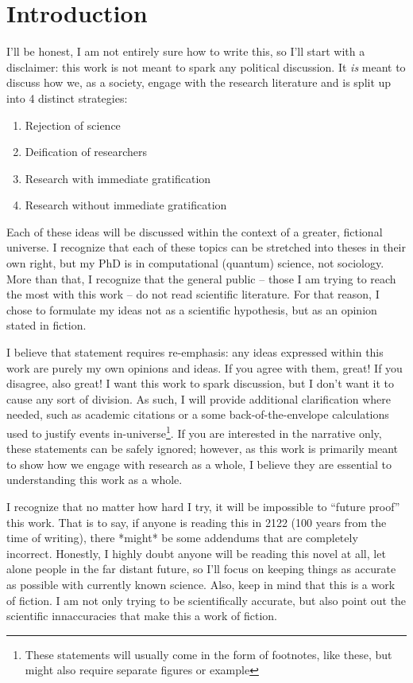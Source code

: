 \chapter*{Introduction}

I'll be honest, I am not entirely sure how to write this, so I'll start with a disclaimer: this work is not meant to spark any political discussion.
It \textit{is} meant to discuss how we, as a society, engage with the research literature and is split up into 4 distinct strategies:

\begin{enumerate}
\item Rejection of science
\item Deification of researchers
\item Research with immediate gratification
\item Research without immediate gratification
\end{enumerate}

Each of these ideas will be discussed within the context of a greater, fictional universe.
I recognize that each of these topics can be stretched into theses in their own right, but my PhD is in computational (quantum) science, not sociology.
More than that, I recognize that the general public -- those I am trying to reach the most with this work -- do not read scientific literature.
For that reason, I chose to formulate my ideas not as a scientific hypothesis, but as an opinion stated in fiction.

I believe that statement requires re-emphasis: any ideas expressed within this work are purely my own opinions and ideas.
If you agree with them, great!
If you disagree, also great!
I want this work to spark discussion, but I don't want it to cause any sort of division.
As such, I will provide additional clarification where needed, such as academic citations or a some back-of-the-envelope calculations used to justify events in-universe\footnote{These statements will usually come in the form of footnotes, like these, but might also require separate figures or example}.
If you are interested in the narrative only, these statements can be safely ignored; however, as this work is primarily meant to show how we engage with research as a whole, I believe they are essential to understanding this work as a whole.

I recognize that no matter how hard I try, it will be impossible to ``future proof'' this work.
That is to say, if anyone is reading this in 2122 (100 years from the time of writing), there *might* be some addendums that are completely incorrect.
Honestly, I highly doubt anyone will be reading this novel at all, let alone people in the far distant future, so I'll focus on keeping things as accurate as possible with currently known science.
Also, keep in mind that this is a work of fiction.
I am not only trying to be scientifically accurate, but also point out the scientific innaccuracies that make this a work of fiction.

